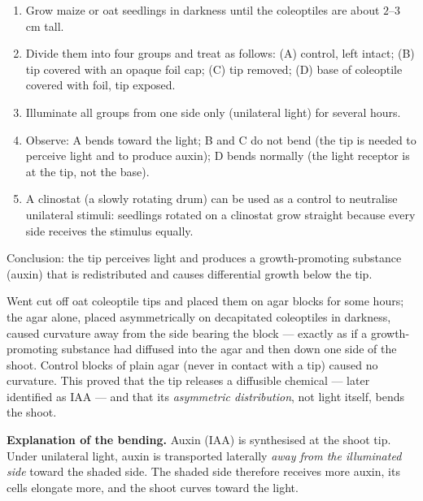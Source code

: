 \documentclass[11pt]{article}
\newcommand{\cle}[1]{{\popxbold\color{popdark}#1}}
\begin{document}
\begin{methode}
\begin{enumerate}
\item Grow maize or oat seedlings in darkness until the coleoptiles are about $2$--$3$ cm tall.
\item Divide them into four groups and treat as follows: (A) control, left intact; (B) tip covered with an opaque foil cap; (C) tip removed; (D) base of coleoptile covered with foil, tip exposed.
\item Illuminate all groups from one side only (unilateral light) for several hours.
\item Observe: A bends toward the light; B and C do not bend (the tip is needed to perceive light and to produce auxin); D bends normally (the light receptor is at the tip, not the base).
\item A \cle{clinostat} (a slowly rotating drum) can be used as a control to neutralise unilateral stimuli: seedlings rotated on a clinostat grow straight because every side receives the stimulus equally.
\end{enumerate}
Conclusion: the tip perceives light and produces a growth-promoting substance (auxin) that is redistributed and causes differential growth below the tip.
\end{methode}

\begin{experience}
Went cut off oat coleoptile tips and placed them on agar blocks for some hours; the agar alone, placed asymmetrically on decapitated coleoptiles in darkness, caused curvature away from the side bearing the block — exactly as if a growth-promoting substance had diffused into the agar and then down one side of the shoot. Control blocks of plain agar (never in contact with a tip) caused no curvature. This proved that the tip releases a diffusible chemical — later identified as IAA — and that its \emph{asymmetric distribution}, not light itself, bends the shoot.
\end{experience}

\textbf{Explanation of the bending.} Auxin (IAA) is synthesised at the shoot tip. Under unilateral light, auxin is transported laterally \emph{away from the illuminated side} toward the shaded side. The shaded side therefore receives more auxin, its cells elongate more, and the shoot curves toward the light.
\end{document}
